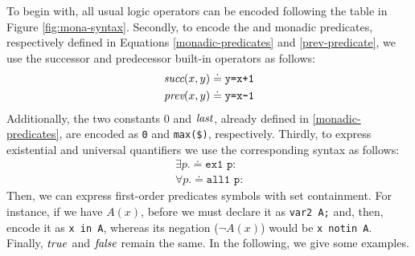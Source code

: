 To begin with, all usual logic operators can be encoded following the table in Figure \ref{fig:mona-syntax}. Secondly, to encode the \suc and \pre monadic predicates, respectively defined in Equations \ref{monadic-predicates} and \ref{prev-predicate}, we use the successor and predecessor built-in operators as follows:
\begin{align*}
\textit{succ}(x,y) \doteq \texttt{y=x+1}\\
\textit{prev}(x,y) \doteq \texttt{y=x-1}
\end{align*}
Additionally, the two constants $0$ and $\mathit{last}$, already defined in \ref{monadic-predicates}, are encoded as \texttt{0} and \texttt{max(\$)}, respectively.
Thirdly, to express existential and universal quantifiers we use the corresponding syntax as follows:
\begin{align*}
\exists p. \doteq \texttt{ex1 p:}\\
\forall p. \doteq \texttt{all1 p:}
\end{align*}
Then, we can express first-order predicates symbols with set containment. For instance, if we have $A(x)$, before we must declare it as \texttt{var2 A;} and, then, encode it as \texttt{x in A}, whereas its negation ($\lnot A(x)$) would be \texttt{x notin A}. Finally, $\mathit{true}$ and $\mathit{false}$ remain the same.
In the following, we give some examples.
